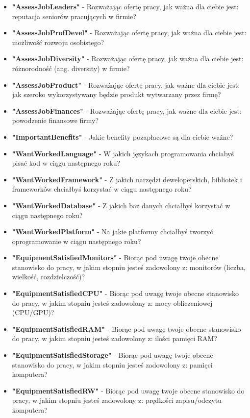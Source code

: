 \begin{appendices}
\begin{itemize}
        \item \textbf{"AssessJobLeaders"} - Rozważając ofertę pracy, jak ważna dla ciebie jest: reputacja seniorów pracujących w firmie?
        \item \textbf{"AssessJobProfDevel"} - Rozważając ofertę pracy, jak ważna dla ciebie jest: możliwość rozwoju osobistego?
        \item \textbf{"AssessJobDiversity"} - Rozważając ofertę pracy, jak ważna dla ciebie jest: różnorodność (ang. diversity) w firmie?
        \item \textbf{"AssessJobProduct"} - Rozważając ofertę pracy, jak ważne dla ciebie jest: jak szeroko wykorzystywany będzie produkt wytwarzany przez firmę?
        \item \textbf{"AssessJobFinances"} - Rozważając ofertę pracy, jak ważne dla ciebie jest: powodzenie finansowe firmy?
        \item \textbf{"ImportantBenefits"} - Jakie benefity pozapłacowe są dla ciebie ważne?
        \item \textbf{"WantWorkedLanguage"} - W jakich językach programowania chciabyś pisać kod w ciągu następnego roku?
        \item \textbf{"WantWorkedFramework"} - Z jakich narzędzi deweloperskich, bibliotek i frameworków chciałbyś korzystać w ciągu następnego roku?
        \item \textbf{"WantWorkedDatabase"} - Z jakich baz danych chciałbyś korzystać w ciągu następnego roku?
        \item \textbf{"WantWorkedPlatform"} - Na jakie platformy chciałbyś tworzyć oprogramowanie w ciągu następnego roku?
        \item \textbf{"EquipmentSatisfiedMonitors"} - Biorąc pod uwagę twoje obecne stanowisko do pracy, w jakim stopniu jesteś zadowolony z: monitorów (liczba, wielkość, rozdzielczość)?
        \item \textbf{"EquipmentSatisfiedCPU"} - Biorąc pod uwagę twoje obecne stanowisko do pracy, w jakim stopniu jesteś zadowolony z: mocy obliczeniowej (CPU/GPU)?
        \item \textbf{"EquipmentSatisfiedRAM"} - Biorąc pod uwagę twoje obecne stanowisko do pracy, w jakim stopniu jesteś zadowolony z: ilości pamięci RAM?
        \item \textbf{"EquipmentSatisfiedStorage"} - Biorąc pod uwagę twoje obecne stanowisko do pracy, w jakim stopniu jesteś zadowolony z: pamięci komputera?
        \item \textbf{"EquipmentSatisfiedRW"} - Biorąc pod uwagę twoje obecne stanowisko do pracy, w jakim stopniu jesteś zadowolony z: prędkości zapisu/odczytu komputera?

\end{itemize}
\end{appendices}
